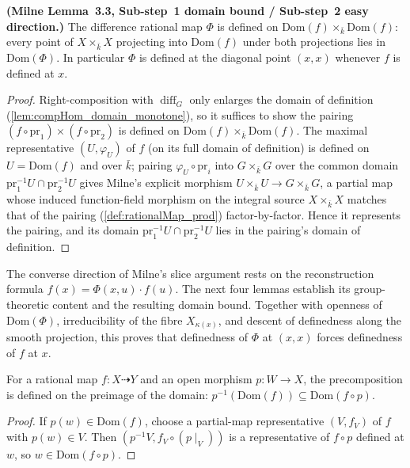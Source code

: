 \begin{lemma}\leanok
  \label{lem:difference_map_domain_lower_bound}
  \textbf{(Milne Lemma~3.3, Sub-step~1 domain bound / Sub-step~2 easy direction.)} The
  difference rational map \(\Phi\) is defined on \(\mathrm{Dom}(f) \times_{\bar k}
  \mathrm{Dom}(f)\): every point of \(X \times_{\bar k} X\) projecting into
  \(\mathrm{Dom}(f)\) under both projections lies in \(\mathrm{Dom}(\Phi)\). In
  particular \(\Phi\) is defined at the diagonal point \((x, x)\) whenever \(f\) is
  defined at \(x\).
\end{lemma}
\begin{proof}\leanok
  Right-composition with \(\operatorname{diff}_G\) only enlarges the domain of
  definition (\cref{lem:compHom_domain_monotone}), so it suffices to show the pairing
  \((f \circ \mathrm{pr}_1) \times (f \circ \mathrm{pr}_2)\) is defined on
  \(\mathrm{Dom}(f) \times_{\bar k} \mathrm{Dom}(f)\). The maximal representative
  \((U, \varphi_U)\) of \(f\) (on its full domain of definition) is defined on \(U =
  \mathrm{Dom}(f)\) and over \(\bar k\); pairing \(\varphi_U \circ \mathrm{pr}_i\) into
  \(G \times_{\bar k} G\) over the common domain
  \(\mathrm{pr}_1^{-1}U \cap \mathrm{pr}_2^{-1}U\) gives Milne's explicit morphism
  \(U \times_{\bar k} U \to G \times_{\bar k} G\), a partial map whose induced
  function-field morphism on the integral source \(X \times_{\bar k} X\) matches that of
  the pairing (\cref{def:rationalMap_prod}) factor-by-factor. Hence it represents the
  pairing, and its domain \(\mathrm{pr}_1^{-1}U \cap \mathrm{pr}_2^{-1}U\) lies in the
  pairing's domain of definition.
\end{proof}

The converse direction of Milne's slice argument rests on the reconstruction formula
\(f(x) = \Phi(x,u) \cdot f(u)\). The next four lemmas establish its group-theoretic
content and the resulting domain bound.  Together with openness of
\(\mathrm{Dom}(\Phi)\), irreducibility of the fibre \(X_{\kappa(x)}\), and descent of
definedness along the smooth projection, this proves that definedness of \(\Phi\) at
\((x,x)\) forces definedness of \(f\) at \(x\).

\begin{lemma}\leanok
  \label{lem:rationalMap_precomp_domain_bound}
  For a rational map \(f \colon X \dashrightarrow Y\) and an open morphism
  \(p \colon W \to X\), the precomposition is defined on the preimage of the domain:
  \(p^{-1}(\mathrm{Dom}(f)) \subseteq \mathrm{Dom}(f \circ p)\).
\end{lemma}
\begin{proof}\leanok
  If \(p(w) \in \mathrm{Dom}(f)\), choose a partial-map representative \((V, f_V)\) of
  \(f\) with \(p(w) \in V\). Then \((p^{-1}V, f_V \circ (p \mid_V))\) is a representative
  of \(f \circ p\) defined at \(w\), so \(w \in \mathrm{Dom}(f \circ p)\).
\end{proof}

